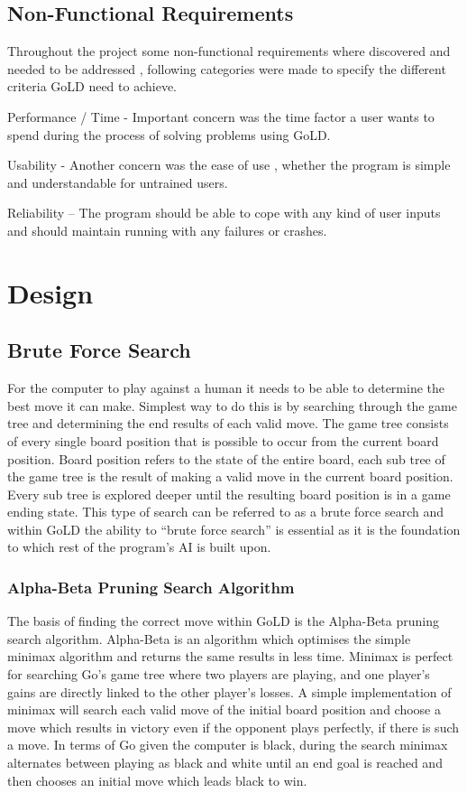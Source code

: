 \documentclass{l4proj}
\begin{document}
\section{Non-Functional Requirements}
Throughout the project some non-functional requirements where discovered and needed to be addressed , following categories were made to specify the different criteria GoLD need to achieve.

Performance / Time - Important concern was the time factor a user wants to spend during the process of solving problems using GoLD.

Usability - Another concern was the ease of use , whether the program is simple and understandable for untrained users.

Reliability – The program should be able to cope with any kind of user inputs and should maintain running with any failures or crashes.



\chapter{Design}


\section{Brute Force Search}
For the computer to play against a human it needs to be able to determine the best move it can make. Simplest way to do this is by searching through the game tree and determining the end results of each valid move. The game tree consists of every single board position that is possible to occur from the current board position. Board position refers to the state of the entire board, each sub tree of the game tree is the result of making a valid move in the current board position. Every sub tree is explored deeper until the resulting board position is in a game ending state. This type of search can be referred to as a brute force search and within GoLD the ability to “brute force search” is essential as it is the foundation to which rest of the program’s AI is built upon.

\subsection{Alpha-Beta Pruning Search Algorithm}

The basis of finding the correct move within GoLD is the Alpha-Beta pruning search algorithm. Alpha-Beta is an algorithm which optimises the simple minimax algorithm and returns the same results in less time. Minimax is perfect for searching Go’s game tree where two players are playing, and one player’s gains are directly linked to the other player’s losses. A simple implementation of minimax will search each valid move of the initial board position and choose a move which results in victory even if the opponent plays perfectly, if there is such a move. In terms of Go given the computer is black, during the search minimax alternates between playing as black and white until an end goal is reached and then chooses an initial move which leads black to win.
\end{document}
